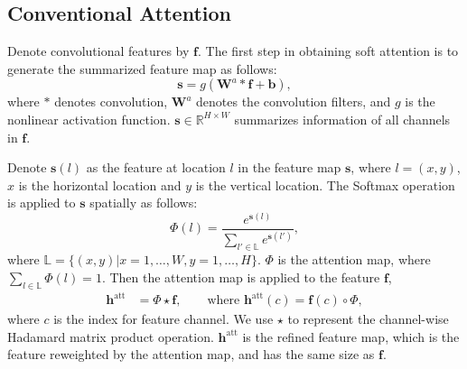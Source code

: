 \documentclass[10pt,twocolumn,letterpaper]{article}
\begin{document}
\subsection{Conventional Attention}
Denote convolutional features by $\mathbf{f}$.
The first step in obtaining soft attention is to generate the summarized feature map as follows:
{\small \vspace{-0.8em}
\begin{equation}
   \mathbf{s} = g(\mathbf{W}^a * \mathbf{f}+\mathbf{b}),
   \label{eq:hidden map}
\end{equation}}
\!\!where $*$ denotes convolution, $\mathbf{W}^a$ denotes the convolution filters, and $g$ is the nonlinear activation function. $\mathbf{s}\in \mathbb{R}^{H\times W}$ summarizes information of all channels in $\mathbf{f}$.

Denote $\mathbf{s}(l)$ as the feature at location $l$ in the feature map $\mathbf{s}$, where $l=(x,y)$, $x$ is the horizontal location and $y$ is the vertical location. The Softmax operation is applied to $\mathbf{s}$ spatially as follows:
{\small \vspace{-0.8em}
\begin{equation}
   \Phi(l) = \frac{e^{\mathbf{s}(l)}}{\sum_{l'\in \mathbb{L}} e^{\mathbf{s}(l')}},
   \label{eq: spatial softmax}
\end{equation}}
\!\!where $\mathbb{L}=\{(x,y)| x=1, \ldots, W, y=1, \ldots, H\}$. $\Phi$ is the attention map, where $\sum_{l\in \mathbb{L}} \Phi(l)=1$.
Then the attention map is applied to the feature $\mathbf{f}$,
{\small \vspace{-1em}
\begin{equation}
\begin{split}
   \mathbf{h}^{\text{att}} &= {\Phi} \star \mathbf{f}, \qquad \textrm{where }  \mathbf{h}^{\text{att}}(c) =\mathbf{f}(c) \circ \Phi,
\end{split}
   \label{eq:AttFeat}
\end{equation} }
\!\!where $c$ is the index for feature channel. We use $\star$ to represent the channel-wise Hadamard matrix product operation. 
$\mathbf{h}^{\text{att}}$ is the refined feature map, which is the feature reweighted by the attention map, and has the same size as $\mathbf{f}$.
\end{document}
